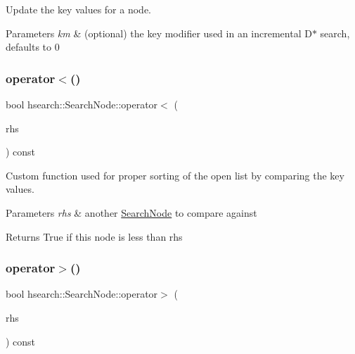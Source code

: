 Update the key values for a node. 


\begin{DoxyParams}{Parameters}
{\em km} & (optional) the key modifier used in an incremental D$\ast$ search, defaults to 0 \\
\hline
\end{DoxyParams}
\mbox{\label{structhsearch_1_1SearchNode_a936d6ea25917367b88adde4748c9143c}} 
\subsubsection{\texorpdfstring{operator$<$()}{operator<()}}
{\footnotesize\ttfamily bool hsearch\+::\+Search\+Node\+::operator$<$ (\begin{DoxyParamCaption}\item[{const \hyperlink{structhsearch_1_1SearchNode}{Search\+Node} \&}]{rhs }\end{DoxyParamCaption}) const}



Custom function used for proper sorting of the open list by comparing the key values. 


\begin{DoxyParams}{Parameters}
{\em rhs} & another \hyperlink{structhsearch_1_1SearchNode}{Search\+Node} to compare against \\
\hline
\end{DoxyParams}
\begin{DoxyReturn}{Returns}
True if this node is less than rhs 
\end{DoxyReturn}
\mbox{\label{structhsearch_1_1SearchNode_a492955fe1a5cdfae1dc0474232cb7175}} 
\subsubsection{\texorpdfstring{operator$>$()}{operator>()}}
{\footnotesize\ttfamily bool hsearch\+::\+Search\+Node\+::operator$>$ (\begin{DoxyParamCaption}\item[{const \hyperlink{structhsearch_1_1SearchNode}{Search\+Node} \&}]{rhs }\end{DoxyParamCaption}) const}




